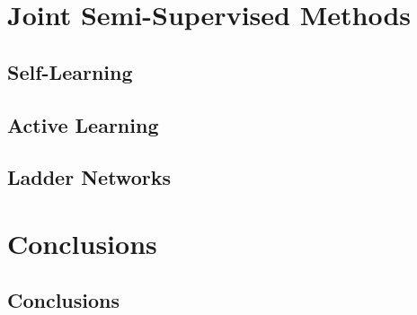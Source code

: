 \documentclass[
11pt, %
english, %
onehalfspacing, %
nolistspacing, %
headsepline, %
consistentlayout, %
]{MastersDoctoralThesis} %
\begin{document}
\part{Joint Semi-Supervised Methods}

\chapter{Self-Learning}\label{chapter:self-learning}


\chapter{Active Learning}\label{chapter:active}


\chapter{Ladder Networks}\label{chapter:ladder}


\part{Conclusions}\label{chapter:conclusions}

\chapter{Conclusions}



\appendix %


%
%
%





\end{document}
